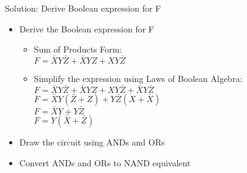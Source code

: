 \ifnum{}
\begin{frame}{Solution: Derive Boolean expression for F}
    \begin{itemize}
        \item Derive the Boolean expression for F
        \begin{itemize}
            \item Sum of Products Form:\\
            \small
            $F = \bar{X}Y\bar{Z} + \bar{X}YZ + XY\bar{Z} $
            \item Simplify the expression using Laws of Boolean Algebra:\\
            \small
            $F = \bar{X}Y\bar{Z} + \bar{X}YZ + XY\bar{Z} +\bar{X}Y\bar{Z}$\\
            $F = \bar{X}Y(\bar{Z}+Z) + Y\bar{Z}(X + \bar{X})$\\
            $F = \bar{X}Y+ Y\bar{Z}$\\ 
            $F = Y(\bar{X}+\bar{Z})$
        \end{itemize}
        \item Draw the circuit using ANDs and ORs
        \item Convert ANDs and ORs to NAND equivalent 
    \end{itemize}
   
 
\end{frame}
\fi




